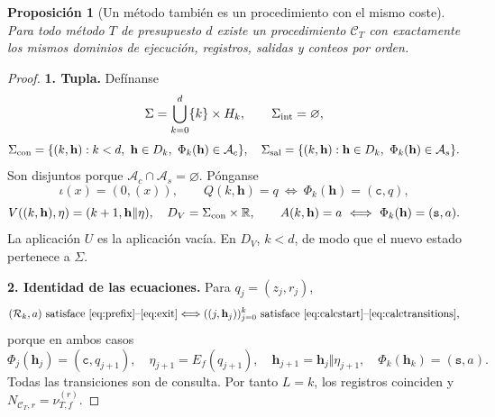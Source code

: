 \documentclass[11pt,a4paper]{article}
\numberwithin{equation}{section}
\newtheorem{proposition}[theorem]{Proposición}
\theoremstyle{definition}
\theoremstyle{remark}
\newcommand{\R}{\mathbb R}
\newcommand{\Rec}{\mathcal R}
\newcommand{\hc}{\mathbf h}
\newcommand{\ct}{\mathtt c}
\newcommand{\st}{\mathtt s}
\newcommand{\paso}[1]{\par\smallskip\noindent\textbf{#1}\quad}
\begin{document}
\begin{proposition}[Un método también es un procedimiento con el mismo coste]\label{prop:methodprocedure}
Para todo método $T$ de presupuesto $d$ existe un procedimiento $\mathscr C_T$ con exactamente los mismos dominios de ejecución, registros, salidas y conteos por orden.
\end{proposition}
\begin{proof}
\paso{1. Tupla.}
Defínanse
\[
\Sigma=\bigcup_{k=0}^d\{k\}\times H_k,\qquad \Sigma_{\rm int}=\varnothing,
\]
\[
\Sigma_{\rm con}=\{(k,\hc):k<d,\ \hc\in D_k,\ \Phi_k(\hc)\in\mathcal A_c\},
\quad
\Sigma_{\rm sal}=\{(k,\hc):\hc\in D_k,\ \Phi_k(\hc)\in\mathcal A_s\}.
\]
Son disjuntos porque $\mathcal A_c\cap\mathcal A_s=\varnothing$. Pónganse
\[
\iota(x)=(0,(x)),\qquad
Q(k,\hc)=q\ \Longleftrightarrow\ \Phi_k(\hc)=(\ct,q),
\]
\[
V((k,\hc),\eta)=(k+1,\hc\Vert\eta),\quad D_V=\Sigma_{\rm con}\times\R,
\qquad
A(k,\hc)=a\ \Longleftrightarrow\ \Phi_k(\hc)=(\st,a).
\]
La aplicación $U$ es la aplicación vacía. En $D_V$, $k<d$, de modo que el nuevo estado pertenece a $\Sigma$.
\paso{2. Identidad de las ecuaciones.}
Para $q_j=(z_j,r_j)$,
\[
(\Rec_k,a)\text{ satisface \eqref{eq:prefix}--\eqref{eq:exit}}
\Longleftrightarrow
((j,\hc_j))_{j=0}^k\text{ satisface \eqref{eq:calcstart}--\eqref{eq:calctransitions}},
\]
porque en ambos casos
\[
\Phi_j(\hc_j)=(\ct,q_{j+1}),\quad
\eta_{j+1}=E_f(q_{j+1}),\quad
\hc_{j+1}=\hc_j\Vert\eta_{j+1},\quad
\Phi_k(\hc_k)=(\st,a).
\]
Todas las transiciones son de consulta. Por tanto $L=k$, los registros coinciden y $N_{\mathscr C_T,r}=\nu^{(r)}_{T,f}$.
\end{proof}
\end{document}
